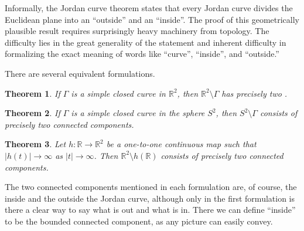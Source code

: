\documentclass[12pt]{article}
\newtheorem{thm}{Theorem}
\theoremstyle{definition}
\theoremstyle{definition}
\theoremstyle{definition}
\newcommand{\RR}{\mathbb{R}}
\begin{document}

Informally, the Jordan curve theorem states that every Jordan curve divides the Euclidean plane into an ``outside'' and an ``inside''.  The proof of this geometrically plausible result requires surprisingly heavy machinery from topology.  The difficulty lies in the great generality of the statement and inherent difficulty in formalizing the exact meaning of words like ``curve'', ``inside'', and ``outside.''

There are several equivalent formulations.

\begin{thm}
If $\Gamma$ is a simple closed curve in $\RR^2$, then $\RR^2 \setminus \Gamma$ has precisely two .
\end{thm}

\begin{thm}
If $\Gamma$ is a simple closed curve in the sphere $S^2$, then $S^2 \setminus \Gamma$ consists of precisely two connected components.
\end{thm}

\begin{thm}
Let $h: \RR \to \RR^2$ be a one-to-one continuous map such that $|h(t)| \to \infty$ as $|t| \to \infty$.  Then $\RR^2 \setminus h(\RR)$ consists of precisely two connected components.
\end{thm}

The two connected components mentioned in each formulation are, of course, the inside and the outside the Jordan curve, although only in the first formulation is there a clear way to say what is out and what is in.  There we can define ``inside'' to be the bounded connected component, as any picture can easily convey.
\end{document}
